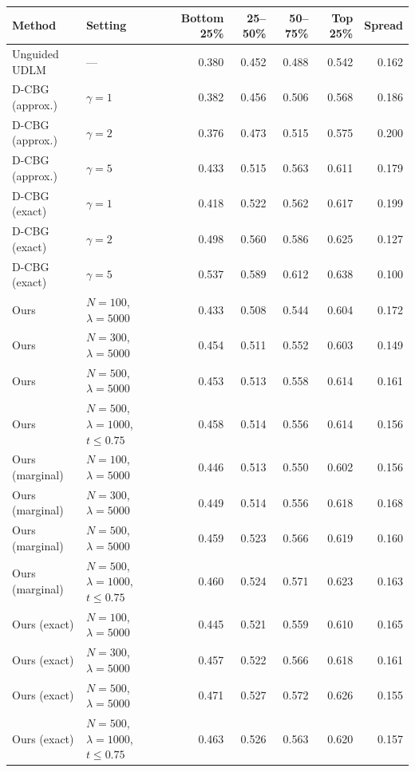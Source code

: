 \begin{tabular}{ll rrrr r}
\toprule
Method & Setting & Bottom 25\% & 25--50\% & 50--75\% & Top 25\% & Spread \\
\midrule
Unguided UDLM & --- & 0.380 & 0.452 & 0.488 & 0.542 & 0.162 \\
\midrule
D-CBG (approx.) & $\gamma = 1$ & 0.382 & 0.456 & 0.506 & 0.568 & 0.186 \\
D-CBG (approx.) & $\gamma = 2$ & 0.376 & 0.473 & 0.515 & 0.575 & 0.200 \\
D-CBG (approx.) & $\gamma = 5$ & 0.433 & 0.515 & 0.563 & 0.611 & 0.179 \\
\midrule
D-CBG (exact) & $\gamma = 1$ & 0.418 & 0.522 & 0.562 & 0.617 & 0.199 \\
D-CBG (exact) & $\gamma = 2$ & 0.498 & 0.560 & 0.586 & 0.625 & 0.127 \\
D-CBG (exact) & $\gamma = 5$ & 0.537 & 0.589 & 0.612 & 0.638 & 0.100 \\
\midrule
Ours & $N{=}100$, $\lambda{=}5000$ & 0.433 & 0.508 & 0.544 & 0.604 & 0.172 \\
Ours & $N{=}300$, $\lambda{=}5000$ & 0.454 & 0.511 & 0.552 & 0.603 & 0.149 \\
Ours & $N{=}500$, $\lambda{=}5000$ & 0.453 & 0.513 & 0.558 & 0.614 & 0.161 \\
Ours & $N{=}500$, $\lambda{=}1000$, $t \le 0.75$ & 0.458 & 0.514 & 0.556 & 0.614 & 0.156 \\
\midrule
Ours (marginal) & $N{=}100$, $\lambda{=}5000$ & 0.446 & 0.513 & 0.550 & 0.602 & 0.156 \\
Ours (marginal) & $N{=}300$, $\lambda{=}5000$ & 0.449 & 0.514 & 0.556 & 0.618 & 0.168 \\
Ours (marginal) & $N{=}500$, $\lambda{=}5000$ & 0.459 & 0.523 & 0.566 & 0.619 & 0.160 \\
Ours (marginal) & $N{=}500$, $\lambda{=}1000$, $t \le 0.75$ & 0.460 & 0.524 & 0.571 & 0.623 & 0.163 \\
\midrule
Ours (exact) & $N{=}100$, $\lambda{=}5000$ & 0.445 & 0.521 & 0.559 & 0.610 & 0.165 \\
Ours (exact) & $N{=}300$, $\lambda{=}5000$ & 0.457 & 0.522 & 0.566 & 0.618 & 0.161 \\
Ours (exact) & $N{=}500$, $\lambda{=}5000$ & 0.471 & 0.527 & 0.572 & 0.626 & 0.155 \\
Ours (exact) & $N{=}500$, $\lambda{=}1000$, $t \le 0.75$ & 0.463 & 0.526 & 0.563 & 0.620 & 0.157 \\
\bottomrule
\end{tabular}
